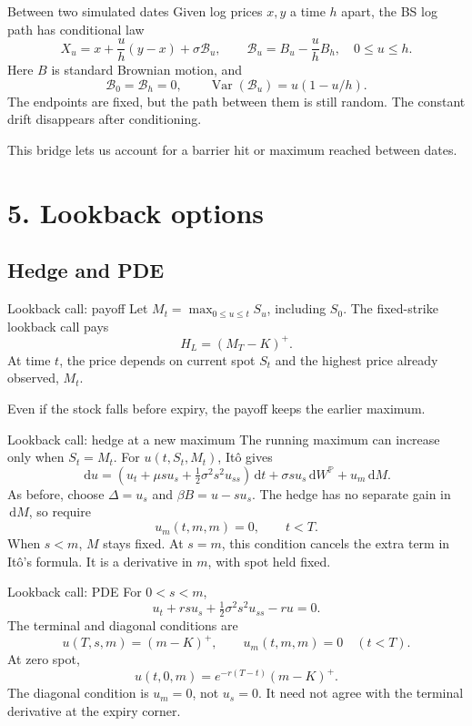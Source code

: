 \documentclass[handout,10pt,t,aspectratio=169]{beamer}
\newcommand{\Pp}{\mathbb P}
\newcommand{\dd}{\,\mathrm d}
\newcommand{\Var}{\operatorname{Var}}
\begin{document}
\begin{frame}{Between two simulated dates}
\small
Given log prices \(x,y\) a time \(h\) apart, the BS log path has conditional law
\[
 X_u=x+\frac uh(y-x)+\sigma\mathcal B_u,
 \qquad \mathcal B_u=B_u-\frac uh B_h,\quad 0\leq u\leq h.
\]
Here \(B\) is standard Brownian motion, and
\[
 \mathcal B_0=\mathcal B_h=0,\qquad
 \Var(\mathcal B_u)=u(1-u/h).
\]
The endpoints are fixed, but the path between them is still random.
The constant drift disappears after conditioning.

\medskip
This bridge lets us account for a barrier hit or maximum reached between dates.
\end{frame}


\section{5. Lookback options}
\subsection{Hedge and PDE}

\begin{frame}{Lookback call: payoff}
\small
Let \(M_t=\max_{0\leq u\leq t}S_u\), including \(S_0\).
The fixed-strike lookback call pays
\[
 \boxed{H_L=(M_T-K)^+.}
\]
At time \(t\), the price depends on current spot \(S_t\) and the highest
price already observed, \(M_t\).

\medskip
Even if the stock falls before expiry, the payoff keeps the earlier maximum.
\end{frame}

\begin{frame}{Lookback call: hedge at a new maximum}
\small
The running maximum can increase only when \(S_t=M_t\).
For \(u(t,S_t,M_t)\), It\^o gives
\[
 \dd u=(u_t+\mu s u_s+\tfrac12\sigma^2s^2u_{ss})\dd t
       +\sigma s u_s\dd W^\Pp+u_m\dd M.
\]
As before, choose \(\Delta=u_s\) and \(\beta B=u-su_s\).
The hedge has no separate gain in \(\dd M\), so require
\[
 \boxed{u_m(t,m,m)=0,\qquad t<T.}
\]
When \(s<m\), \(M\) stays fixed. At \(s=m\), this condition cancels
the extra term in It\^o's formula. It is a derivative in \(m\), with spot held fixed.
\end{frame}


\begin{frame}{Lookback call: PDE}
\small
For \(0<s<m\),
\[
 u_t+rsu_s+\tfrac12\sigma^2s^2u_{ss}-ru=0.
\]
The terminal and diagonal conditions are
\[
 \boxed{u(T,s,m)=(m-K)^+,\qquad u_m(t,m,m)=0\quad(t<T).}
\]
At zero spot,
\[
 u(t,0,m)=e^{-r(T-t)}(m-K)^+.
\]
The diagonal condition is \(u_m=0\), not \(u_s=0\).
It need not agree with the terminal derivative at the expiry corner.
\end{frame}
\end{document}
